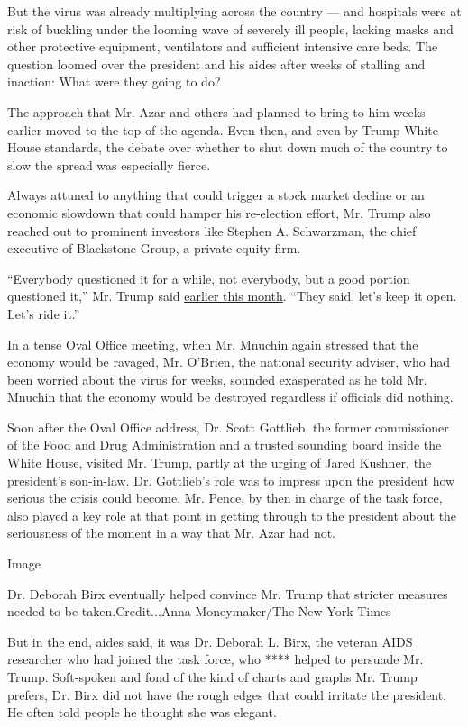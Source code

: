 But the virus was already multiplying across the country --- and
hospitals were at risk of buckling under the looming wave of severely
ill people, lacking masks and other protective equipment, ventilators
and sufficient intensive care beds. The question loomed over the
president and his aides after weeks of stalling and inaction: What were
they going to do?

The approach that Mr. Azar and others had planned to bring to him weeks
earlier moved to the top of the agenda. Even then, and even by Trump
White House standards, the debate over whether to shut down much of the
country to slow the spread was especially fierce.

Always attuned to anything that could trigger a stock market decline or
an economic slowdown that could hamper his re-election effort, Mr. Trump
also reached out to prominent investors like Stephen A. Schwarzman, the
chief executive of Blackstone Group, a private equity firm.

``Everybody questioned it for a while, not everybody, but a good portion
questioned it,'' Mr. Trump said
\href{https://www.whitehouse.gov/briefings-statements/remarks-president-trump-vice-president-pence-members-coronavirus-task-force-press-briefing-17/}{earlier
this month}. ``They said, let's keep it open. Let's ride it.''

In a tense Oval Office meeting, when Mr. Mnuchin again stressed that the
economy would be ravaged, Mr. O'Brien, the national security adviser,
who had been worried about the virus for weeks, sounded exasperated as
he told Mr. Mnuchin that the economy would be destroyed regardless if
officials did nothing.

Soon after the Oval Office address, Dr. Scott Gottlieb, the former
commissioner of the Food and Drug Administration and a trusted sounding
board inside the White House, visited Mr. Trump, partly at the urging of
Jared Kushner, the president's son-in-law. Dr. Gottlieb's role was to
impress upon the president how serious the crisis could become. Mr.
Pence, by then in charge of the task force, also played a key role at
that point in getting through to the president about the seriousness of
the moment in a way that Mr. Azar had not.

Image

Dr. Deborah Birx eventually helped convince Mr. Trump that stricter
measures needed to be taken.Credit...Anna Moneymaker/The New York Times

But in the end, aides said, it was Dr. Deborah L. Birx, the veteran AIDS
researcher who had joined the task force, who **** helped to persuade
Mr. Trump. Soft-spoken and fond of the kind of charts and graphs Mr.
Trump prefers, Dr. Birx did not have the rough edges that could irritate
the president. He often told people he thought she was elegant.

